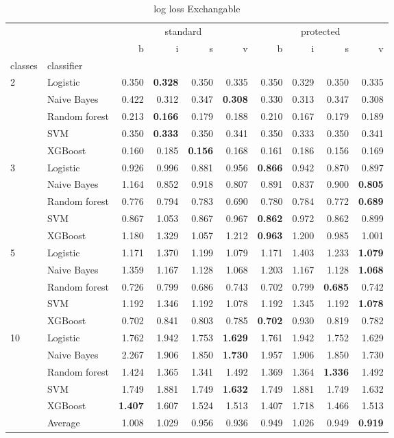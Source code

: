 \begin{table}
\caption{log loss Exchangable}
\begin{tabular}{l|l|rrrr|rrrr}
\toprule
 &  & \multicolumn{4}{c}{standard} & \multicolumn{4}{c}{protected} \\
 &  & b & i & s & v & b & i & s & v \\
classes & classifier &  &  &  &  &  &  &  &  \\
\midrule
\midrule
\multirow[c]{5}{*}{2} & Logistic & 0.350 & \textbf{0.328} & 0.350 & 0.335 & 0.350 & 0.329 & 0.350 & 0.335 \\
 & Naive Bayes & 0.422 & 0.312 & 0.347 & \textbf{0.308} & 0.330 & 0.313 & 0.347 & 0.308 \\
 & Random forest & 0.213 & \textbf{0.166} & 0.179 & 0.188 & 0.210 & 0.167 & 0.179 & 0.189 \\
 & SVM & 0.350 & \textbf{0.333} & 0.350 & 0.341 & 0.350 & 0.333 & 0.350 & 0.341 \\
 & XGBoost & 0.160 & 0.185 & \textbf{0.156} & 0.168 & 0.161 & 0.186 & 0.156 & 0.169 \\
\midrule
\multirow[c]{5}{*}{3} & Logistic & 0.926 & 0.996 & 0.881 & 0.956 & \textbf{0.866} & 0.942 & 0.870 & 0.897 \\
 & Naive Bayes & 1.164 & 0.852 & 0.918 & 0.807 & 0.891 & 0.837 & 0.900 & \textbf{0.805} \\
 & Random forest & 0.776 & 0.794 & 0.783 & 0.690 & 0.780 & 0.784 & 0.772 & \textbf{0.689} \\
 & SVM & 0.867 & 1.053 & 0.867 & 0.967 & \textbf{0.862} & 0.972 & 0.862 & 0.899 \\
 & XGBoost & 1.180 & 1.329 & 1.057 & 1.212 & \textbf{0.963} & 1.200 & 0.985 & 1.001 \\
\midrule
\multirow[c]{5}{*}{5} & Logistic & 1.171 & 1.370 & 1.199 & 1.079 & 1.171 & 1.403 & 1.233 & \textbf{1.079} \\
 & Naive Bayes & 1.359 & 1.167 & 1.128 & 1.068 & 1.203 & 1.167 & 1.128 & \textbf{1.068} \\
 & Random forest & 0.726 & 0.799 & 0.686 & 0.743 & 0.702 & 0.799 & \textbf{0.685} & 0.742 \\
 & SVM & 1.192 & 1.346 & 1.192 & 1.078 & 1.192 & 1.345 & 1.192 & \textbf{1.078} \\
 & XGBoost & 0.702 & 0.841 & 0.803 & 0.785 & \textbf{0.702} & 0.930 & 0.819 & 0.782 \\
\midrule
\multirow[c]{5}{*}{10} & Logistic & 1.762 & 1.942 & 1.753 & \textbf{1.629} & 1.761 & 1.942 & 1.752 & 1.629 \\
 & Naive Bayes & 2.267 & 1.906 & 1.850 & \textbf{1.730} & 1.957 & 1.906 & 1.850 & 1.730 \\
 & Random forest & 1.424 & 1.365 & 1.341 & 1.492 & 1.369 & 1.364 & \textbf{1.336} & 1.492 \\
 & SVM & 1.749 & 1.881 & 1.749 & \textbf{1.632} & 1.749 & 1.881 & 1.749 & 1.632 \\
 & XGBoost & \textbf{1.407} & 1.607 & 1.524 & 1.513 & 1.407 & 1.718 & 1.466 & 1.513 \\\midrule\ & Average & 1.008 & 1.029 & 0.956 & 0.936 & 0.949 & 1.026 & 0.949 & \textbf{0.919} \\
\bottomrule
\end{tabular}
\end{table}
